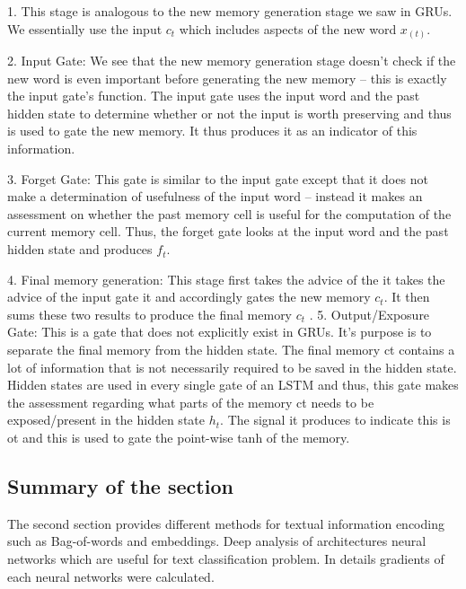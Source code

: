 1. This stage is analogous to the new memory
generation stage we saw in GRUs. We essentially use the input
$c_t$ which includes aspects of the new word $x_(t)$.

2. Input Gate: We see that the new memory generation stage doesn’t
check if the new word is even important before generating the new
memory – this is exactly the input gate’s function. The input gate
uses the input word and the past hidden state to determine whether
or not the input is worth preserving and thus is used to gate the new
memory. It thus produces it as an indicator of this information.

3. Forget Gate: This gate is similar to the input gate except that it
does not make a determination of usefulness of the input word –
instead it makes an assessment on whether the past memory cell is
useful for the computation of the current memory cell. Thus, the
forget gate looks at the input word and the past hidden state and
produces $f_t$.

4. Final memory generation: This stage first takes the advice of the
it takes the advice of the input gate it and accordingly gates
the new memory $c_t$. It then sums these two results to produce the
final memory  $c_t$
.
5. Output/Exposure Gate: This is a gate that does not explicitly exist
in GRUs. It’s purpose is to separate the final memory from the
hidden state. The final memory ct contains a lot of information that
is not necessarily required to be saved in the hidden state. Hidden
states are used in every single gate of an LSTM and thus, this gate
makes the assessment regarding what parts of the memory ct needs
to be exposed/present in the hidden state $h_t$. The signal it produces
to indicate this is ot and this is used to gate the point-wise tanh of
the memory.

\subsection{Summary of the section}
The second section provides different methods for textual information encoding such as Bag-of-words and embeddings. Deep analysis of architectures neural networks which are useful for text classification problem. In details gradients of each neural networks were calculated.   